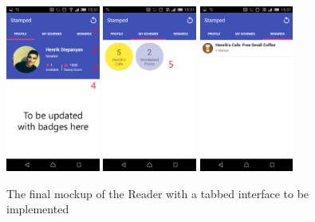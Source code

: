 \begin{figure}[H]
 \centering
  \includegraphics[width=0.275\textwidth]{img/moremock2.png}
   \includegraphics[width=0.275\textwidth]{img/finalmock.png}
    \includegraphics[width=0.275\textwidth]{img/moremock1.png}
     \caption{The final mockup of the Reader with a tabbed interface to be implemented}
     \label{fig:wireframe3}
\end{figure}

